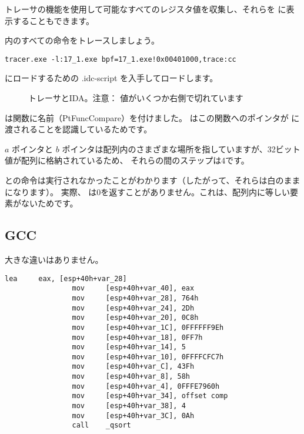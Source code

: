 トレーサの機能を使用して可能なすべてのレジスタ値を収集し、それらを \IDA に表示することもできます。

\comp 内のすべての命令をトレースしましょう。

\begin{lstlisting}
tracer.exe -l:17_1.exe bpf=17_1.exe!0x00401000,trace:cc
\end{lstlisting}

\IDA にロードするための .idc-script を入手してロードします。

\begin{figure}[H]
\centering
{}
\caption{トレーサとIDA。注意：
値がいくつか右側で切れています}
\label{fig:qsort_tracer_cc}
\end{figure}

\IDA は関数に名前（PtFuncCompare）を付けました。 \IDA はこの関数へのポインタが \qsort に渡されることを認識しているためです。

$a$ ポインタと $b$ ポインタは配列内のさまざまな場所を指していますが、32ビット値が配列に格納されているため、
それらの間のステップは4です。

との命令は実行されなかったことがわかります（したがって、それらは白のままになります）。
実際、 \comp は0を返すことがありません。これは、配列内に等しい要素がないためです。

\subsection{GCC}

大きな違いはありません。

\begin{lstlisting}[caption=GCC,style=customasmx86]
                lea     eax, [esp+40h+var_28]
                mov     [esp+40h+var_40], eax
                mov     [esp+40h+var_28], 764h
                mov     [esp+40h+var_24], 2Dh
                mov     [esp+40h+var_20], 0C8h
                mov     [esp+40h+var_1C], 0FFFFFF9Eh
                mov     [esp+40h+var_18], 0FF7h
                mov     [esp+40h+var_14], 5
                mov     [esp+40h+var_10], 0FFFFCFC7h
                mov     [esp+40h+var_C], 43Fh
                mov     [esp+40h+var_8], 58h
                mov     [esp+40h+var_4], 0FFFE7960h
                mov     [esp+40h+var_34], offset comp
                mov     [esp+40h+var_38], 4
                mov     [esp+40h+var_3C], 0Ah
                call    _qsort
\end{lstlisting}


